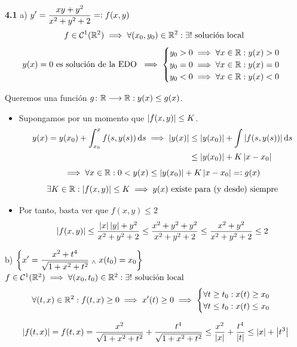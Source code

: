\textbf{4.1} a) $\displaystyle y' = \frac{xy + y^2}{x^2 + y^2 + 2} =\vcentcolon f(x, y)$
\[f\in \mathcal{C}^1(\mathbb{R}^2) \implies \forall (x_0, y_0) \in \mathbb{R}^2 : \exists ! \text{ solución local }\]
\[y(x)=0 \text{ es solución de la EDO }\implies \begin{cases}
		y_0>0 \implies \forall x \in \mathbb{R} : y(x)>0 \\
		y_0=0 \implies \forall x \in \mathbb{R} : y(x)=0 \\
		y_0<0 \implies \forall x \in \mathbb{R} : y(x)<0 \\
	\end{cases}\]

Queremos una función $g \colon \mathbb{R} \longrightarrow \mathbb{R} : y(x) \leq g(x)$.
\begin{itemize}
	\item Supongamos por un momento que $\left|f(x, y)\right|\leq K$.
	      \[\ds \begin{aligned}
			      y(x)=y(x_0) + \int_{x_0}^x f(s, y(s)) \odif{s}\implies
			      \abs{y(x)} & \leq \abs{y(x_0)} + \int \abs{f(s,y(s))} \odif{s} \\
			                 & \leq \abs{y(x_0)} + K\abs{x-x_0}
		      \end{aligned}\]
	      \[\implies \forall x \in \mathbb{R} : 0 < y(x) \leq \left|y(x_0)\right| + K\left|x-x_0\right| =\vcentcolon g(x)\]
	      \[\exists K \in \mathbb{R} : \left|f(x, y)\right| \leq K \implies y(x) \text{ existe para (y desde) siempre}\]

	\item Por tanto, basta ver que $f(x, y) \leq 2$
	      \[\left|f(x, y)\right| \leq \frac{\left|x\right| \left|y\right| + y^2}{x^2+y^2 +2}\leq \frac{x^2+y^2 + y^2}{x^2+y^2 +2} \leq \frac{x^2 + y^2}{x^2+y^2+2}\leq 2\]
\end{itemize}

b) $\displaystyle \left\{x'=\frac{x^2+t^4}{\sqrt{1+x^2+t^2}} \; _{\wedge} \; x(t_0) = x_0\right\}$ $f\in \mathcal{C}^1(\mathbb{R}^2) \implies \forall (x_0, t_0) \in \mathbb{R}^2 : \exists ! \text{ solución local}$
\[\forall (t, x) \in \mathbb{R}^2 : f(t, x) \geq 0 \implies x'(t) \geq 0 \implies \begin{cases}
		\forall t \geq t_0 : x(t) \geq x_0 \\
		\forall t \leq t_0 : x(t) \leq x_0
	\end{cases}\]

\[\left|f(t, x)\right| = f(t, x) = \frac{x^2}{\sqrt{1+x^2+t^2}} + \frac{t^4}{\sqrt{1+x^2+t^2}} \leq \frac{x^2}{\left|x\right|} + \frac{t^4}{\left|t\right|} \leq \left|x\right| + \left|t^3\right|\]


